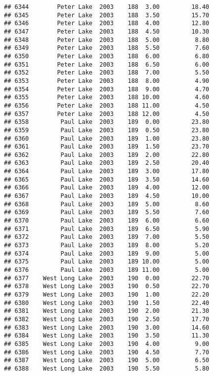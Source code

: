 \documentclass[
]{article}
\begin{document}
\begin{verbatim}
## 6344        Peter Lake  2003    188  3.00         18.40
## 6345        Peter Lake  2003    188  3.50         15.70
## 6346        Peter Lake  2003    188  4.00         12.80
## 6347        Peter Lake  2003    188  4.50         10.30
## 6348        Peter Lake  2003    188  5.00          8.80
## 6349        Peter Lake  2003    188  5.50          7.60
## 6350        Peter Lake  2003    188  6.00          6.80
## 6351        Peter Lake  2003    188  6.50          6.00
## 6352        Peter Lake  2003    188  7.00          5.50
## 6353        Peter Lake  2003    188  8.00          4.90
## 6354        Peter Lake  2003    188  9.00          4.70
## 6355        Peter Lake  2003    188 10.00          4.60
## 6356        Peter Lake  2003    188 11.00          4.50
## 6357        Peter Lake  2003    188 12.00          4.50
## 6358         Paul Lake  2003    189  0.00         23.80
## 6359         Paul Lake  2003    189  0.50         23.80
## 6360         Paul Lake  2003    189  1.00         23.80
## 6361         Paul Lake  2003    189  1.50         23.70
## 6362         Paul Lake  2003    189  2.00         22.80
## 6363         Paul Lake  2003    189  2.50         20.40
## 6364         Paul Lake  2003    189  3.00         17.80
## 6365         Paul Lake  2003    189  3.50         14.60
## 6366         Paul Lake  2003    189  4.00         12.00
## 6367         Paul Lake  2003    189  4.50         10.00
## 6368         Paul Lake  2003    189  5.00          8.60
## 6369         Paul Lake  2003    189  5.50          7.60
## 6370         Paul Lake  2003    189  6.00          6.60
## 6371         Paul Lake  2003    189  6.50          5.90
## 6372         Paul Lake  2003    189  7.00          5.50
## 6373         Paul Lake  2003    189  8.00          5.20
## 6374         Paul Lake  2003    189  9.00          5.00
## 6375         Paul Lake  2003    189 10.00          5.00
## 6376         Paul Lake  2003    189 11.00          5.00
## 6377    West Long Lake  2003    190  0.00         22.70
## 6378    West Long Lake  2003    190  0.50         22.70
## 6379    West Long Lake  2003    190  1.00         22.20
## 6380    West Long Lake  2003    190  1.50         22.40
## 6381    West Long Lake  2003    190  2.00         21.30
## 6382    West Long Lake  2003    190  2.50         17.70
## 6383    West Long Lake  2003    190  3.00         14.60
## 6384    West Long Lake  2003    190  3.50         11.30
## 6385    West Long Lake  2003    190  4.00          9.00
## 6386    West Long Lake  2003    190  4.50          7.70
## 6387    West Long Lake  2003    190  5.00          6.50
## 6388    West Long Lake  2003    190  5.50          5.80

\end{verbatim}
\end{document}
